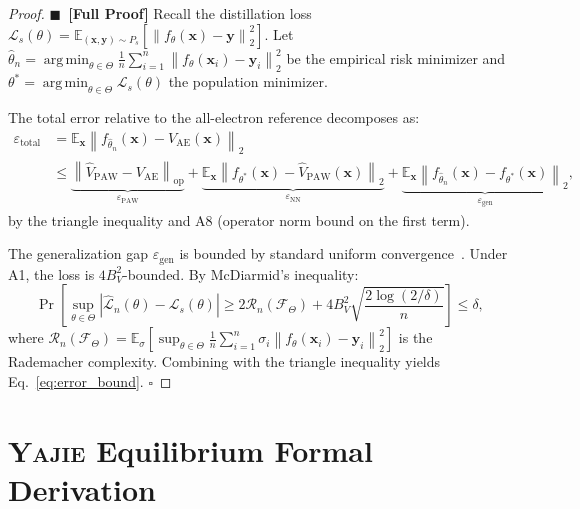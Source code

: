 \documentclass[11pt,a4paper]{article}
\theoremstyle{definition}
\newcommand{\rigorFull}[0]{$\blacksquare$~\textbf{[Full Proof]}}
\newcommand{\Yajie}{\textsc{Yajie}}
\DeclareMathOperator*{\argmin}{arg\,min}
\newcommand{\E}{\mathbb{E}}
\newcommand{\norm}[1]{\left\lVert#1\right\rVert}
\begin{document}
\begin{proof}\rigorFull
Recall the distillation loss $\mathcal{L}_s(\theta) = \E_{(\mathbf{x},\mathbf{y})\sim P_s}[\norm{f_\theta(\mathbf{x}) - \mathbf{y}}_2^2]$. Let $\hat{\theta}_n = \argmin_{\theta \in \Theta} \frac{1}{n}\sum_{i=1}^n \norm{f_\theta(\mathbf{x}_i) - \mathbf{y}_i}_2^2$ be the empirical risk minimizer and $\theta^* = \argmin_{\theta \in \Theta} \mathcal{L}_s(\theta)$ the population minimizer.

The total error relative to the all-electron reference decomposes as:
\begin{align}
\varepsilon_{\mathrm{total}} &= \E_{\mathbf{x}}\norm{f_{\hat{\theta}_n}(\mathbf{x}) - V_{\mathrm{AE}}(\mathbf{x})}_2 \\
&\leq \underbrace{\norm{\hat{V}_{\mathrm{PAW}} - V_{\mathrm{AE}}}_{\mathrm{op}}}_{\varepsilon_{\mathrm{PAW}}} + \underbrace{\E_{\mathbf{x}}\norm{f_{\theta^*}(\mathbf{x}) - \hat{V}_{\mathrm{PAW}}(\mathbf{x})}_2}_{\varepsilon_{\mathrm{NN}}} + \underbrace{\E_{\mathbf{x}}\norm{f_{\hat{\theta}_n}(\mathbf{x}) - f_{\theta^*}(\mathbf{x})}_2}_{\varepsilon_{\mathrm{gen}}},
\end{align}
by the triangle inequality and A8 (operator norm bound on the first term).

The generalization gap $\varepsilon_{\mathrm{gen}}$ is bounded by standard uniform convergence~\cite{Bartlett2002,Shalev-Shwartz2014}. Under A1, the loss is $4B_V^2$-bounded. By McDiarmid's inequality:
\begin{equation}
\Pr\left[\sup_{\theta \in \Theta} |\hat{\mathcal{L}}_n(\theta) - \mathcal{L}_s(\theta)| \geq 2\mathcal{R}_n(\mathcal{F}_\Theta) + 4B_V^2\sqrt{\frac{2\log(2/\delta)}{n}}\right] \leq \delta,
\end{equation}
where $\mathcal{R}_n(\mathcal{F}_\Theta) = \E_{\sigma}\left[\sup_{\theta \in \Theta} \frac{1}{n}\sum_{i=1}^n \sigma_i \norm{f_\theta(\mathbf{x}_i) - \mathbf{y}_i}_2^2\right]$ is the Rademacher complexity. Combining with the triangle inequality yields Eq.~\eqref{eq:error_bound}. $\square$
\end{proof}

\section{\Yajie{} Equilibrium Formal Derivation}
\label{sec:app_yajie}
\end{document}
